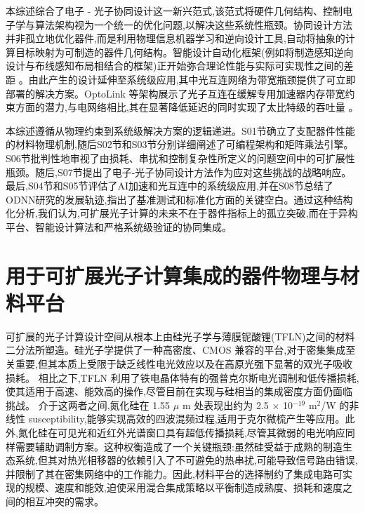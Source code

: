 \documentclass[11pt]{article}
\begin{document}
本综述综合了电子 - 光子协同设计这一新兴范式,该范式将硬件几何结构、控制电子学与算法架构视为一个统一的优化问题,以解决这些系统性瓶颈。协同设计方法并非孤立地优化器件,而是利用物理信息机器学习和逆向设计工具,自动将抽象的计算目标映射为可制造的器件几何结构。智能设计自动化框架(例如将制造感知逆向设计与布线感知布局相结合的框架)正开始弥合理论性能与实际可实现性之间的差距 \citep{doi_10_1117_12_3066105_d6297c38}。由此产生的设计延伸至系统级应用,其中光互连网络为带宽瓶颈提供了可立即部署的解决方案。OptoLink 等架构展示了光子互连在缓解专用加速器内存带宽约束方面的潜力,与电网络相比,其在显著降低延迟的同时实现了太比特级的吞吐量 \citep{doi_10_1145_3806395_315ab915}。

本综述遵循从物理约束到系统级解决方案的逻辑递进。S01节确立了支配器件性能的材料物理机制,随后S02节和S03节分别详细阐述了可编程架构和矩阵乘法引擎。S06节批判性地审视了由损耗、串扰和控制复杂性所定义的问题空间中的可扩展性瓶颈。随后,S07节提出了电子-光子协同设计方法作为应对这些挑战的战略响应。最后,S04节和S05节评估了AI加速和光互连中的系统级应用,并在S08节总结了ODNN研究的发展轨迹,指出了基准测试和标准化方面的关键空白。通过这种结构化分析,我们认为,可扩展光子计算的未来不在于器件指标上的孤立突破,而在于异构平台、智能设计算法和严格系统级验证的协同集成。

\section{用于可扩展光子计算集成的器件物理与材料平台}\label{ux7528ux4e8eux53efux6269ux5c55ux5149ux5b50ux8ba1ux7b97ux96c6ux6210ux7684ux5668ux4ef6ux7269ux7406ux4e0eux6750ux6599ux5e73ux53f0}

可扩展的光子计算设计空间从根本上由硅光子学与薄膜铌酸锂(TFLN)之间的材料二分法所塑造。硅光子学提供了一种高密度、CMOS 兼容的平台,对于密集集成至关重要,但其本质上受限于缺乏线性电光效应以及在高原光强下显著的双光子吸收损耗。\citep{doi_10_3390_photonics11040375_bd102ef0} \citep{doi_10_3390_photonics12010005_5e399e5f} 相比之下,TFLN 利用了铁电晶体特有的强普克尔斯电光调制和低传播损耗,使其适用于高速、能效高的操作,尽管目前在实现与硅相当的集成密度方面仍面临挑战。\citep{doi_10_3390_photonics12111129_03f4b6cd} \citep{doi_10_3390_mi17060751_d3932b5d} 介于这两者之间,氮化硅在 1.55 \(\mu\) m 处表现出约为 2.5 \(\times\) 10\(^{-19}\) m\(^{2}\)/W 的非线性 susceptibility,能够实现高效的四波混频过程,适用于克尔微梳产生等应用。此外,氮化硅在可见光和近红外光谱窗口具有超低传播损耗,尽管其微弱的电光响应同样需要辅助调制方案。这种权衡造成了一个关键瓶颈:虽然硅受益于成熟的制造生态系统,但其对热光相移器的依赖引入了不可避免的热串扰,可能导致信号路由错误,并限制了其在密集网络中的工作能力。因此,材料平台的选择制约了集成电路可实现的规模、速度和能效,迫使采用混合集成策略以平衡制造成熟度、损耗和速度之间的相互冲突的需求。\citep{doi_10_48550_arxiv_2209_10098_b3bedb78} \citep{doi_10_1126_science_abj4396_40f36a09} \citep{doi_10_1149_ma2026_01311465mtgabs_643e381a} \citep{doi_10_1109_access_2020_3013116_8fec1fb2}
\end{document}
